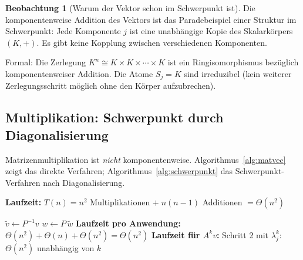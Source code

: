 ﻿\documentclass[a4paper,12pt]{report}
\theoremstyle{definition}
\newtheorem{beobachtung}{Beobachtung}
\begin{document}
\begin{beobachtung}[Warum der Vektor schon im Schwerpunkt ist]
    Die komponentenweise Addition des Vektors ist das Paradebeispiel
    einer Struktur im Schwerpunkt: Jede Komponente $j$ ist eine
    unabhängige Kopie des Skalarkörpers $(K, +)$. Es gibt keine
    Kopplung zwischen verschiedenen Komponenten.

    Formal: Die Zerlegung $K^n \cong K \times K \times \cdots \times K$
    ist ein Ringisomorphismus bezüglich komponentenweiser Addition.
    Die Atome $S_j = K$ sind irreduzibel (kein weiterer Zerlegungsschritt
    möglich ohne den Körper aufzubrechen).
\end{beobachtung}

\subsection*{Multiplikation: Schwerpunkt durch Diagonalisierung}

Matrizenmultiplikation ist \emph{nicht} komponentenweise. Algorithmus~\ref{alg:matvec} zeigt das direkte Verfahren; Algorithmus~\ref{alg:schwerpunkt} das Schwerpunkt-Verfahren nach Diagonalisierung.


\begin{algorithm}[H]
\DontPrintSemicolon
\caption{Matrix-Vektor-Produkt (direkt)}\label{alg:matvec}
\;
\BlankLine
\textbf{Laufzeit:} $T(n) = n^2$ Multiplikationen $+\; n(n-1)$ Additionen $= \Theta(n^2)$
\end{algorithm}

\begin{algorithm}[H]
\DontPrintSemicolon
\caption{Matrix-Vektor-Produkt im Schwerpunkt}\label{alg:schwerpunkt}
$\tilde{v} \leftarrow P^{-1} v$ 
\BlankLine
{}
\BlankLine
{}
$w \leftarrow P\, \tilde{w}$ 
\;
\BlankLine
\textbf{Laufzeit pro Anwendung:} $\Theta(n^2) + \Theta(n) + \Theta(n^2) = \Theta(n^2)$\;
\textbf{Laufzeit für $A^k v$:} Schritt 2 mit $\lambda_j^k$: $\Theta(n^2)$ unabhängig von $k$
\end{algorithm}
\end{document}
